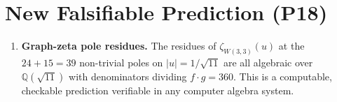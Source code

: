 \section{New Falsifiable Prediction (P18)}
\label{sec:p18}

\begin{enumerate}[label=\textbf{P\arabic*.},start=18]
  \item \textbf{Graph-zeta pole residues.}
        The residues of $\zeta_{W(3,3)}(u)$ at the $24+15=39$
        non-trivial poles on $|u|=1/\sqrt{11}$ are all algebraic
        over $\mathbb{Q}(\sqrt{11})$ with denominators dividing
        $f\cdot g=360$.  This is a computable, checkable prediction
        verifiable in any computer algebra system.
\end{enumerate}
